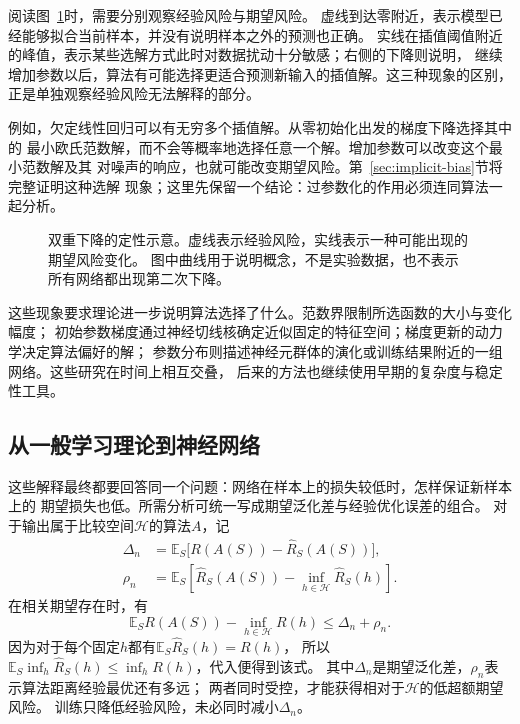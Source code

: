 阅读图~\ref{fig:learning-double-descent}时，需要分别观察经验风险与期望风险。
虚线到达零附近，表示模型已经能够拟合当前样本，并没有说明样本之外的预测也正确。
实线在插值阈值附近的峰值，表示某些选解方式此时对数据扰动十分敏感；右侧的下降则说明，
继续增加参数以后，算法有可能选择更适合预测新输入的插值解。这三种现象的区别，
正是单独观察经验风险无法解释的部分。

例如，欠定线性回归可以有无穷多个插值解。从零初始化出发的梯度下降选择其中的
最小欧氏范数解，而不会等概率地选择任意一个解。增加参数可以改变这个最小范数解及其
对噪声的响应，也就可能改变期望风险。第~\ref{sec:implicit-bias}节将完整证明这种选解
现象；这里先保留一个结论：过参数化的作用必须连同算法一起分析。

\begin{figure}[!htb]
 \centering
 
 \caption{双重下降的定性示意。虚线表示经验风险，实线表示一种可能出现的期望风险变化。
 图中曲线用于说明概念，不是实验数据，也不表示所有网络都出现第二次下降。}
 \label{fig:learning-double-descent}
\end{figure}

这些现象要求理论进一步说明算法选择了什么。范数界限制所选函数的大小与变化幅度；
初始参数梯度通过神经切线核确定近似固定的特征空间；梯度更新的动力学决定算法偏好的解；
参数分布则描述神经元群体的演化或训练结果附近的一组网络。这些研究在时间上相互交叠，
后来的方法也继续使用早期的复杂度与稳定性工具。

\subsection{从一般学习理论到神经网络}
\label{sec:deep-general-learning}

这些解释最终都要回答同一个问题：网络在样本上的损失较低时，怎样保证新样本上的
期望损失也低。所需分析可统一写成期望泛化差与经验优化误差的组合。
对于输出属于比较空间$\mathcal H$的算法$A$，记
\[
 \begin{aligned}
 \Delta_n&=\mathbb E_S\bigl[R(A(S))-\hat R_S(A(S))\bigr],\\
 \rho_n&=\mathbb E_S\left[\hat R_S(A(S))-
                         \inf_{h\in\mathcal H}\hat R_S(h)\right].
 \end{aligned}
\]
在相关期望存在时，有
\begin{equation}
 \mathbb E_S R(A(S))-\inf_{h\in\mathcal H}R(h)
 \leq\Delta_n+\rho_n.
 \label{eq:deep-risk-decomposition}
\end{equation}
因为对于每个固定$h$都有$\mathbb E_S\hat R_S(h)=R(h)$，
所以$\mathbb E_S\inf_h\hat R_S(h)\leq\inf_h R(h)$，代入便得到该式。
其中$\Delta_n$是期望泛化差，$\rho_n$表示算法距离经验最优还有多远；
两者同时受控，才能获得相对于$\mathcal H$的低超额期望风险。
训练只降低经验风险，未必同时减小$\Delta_n$。

